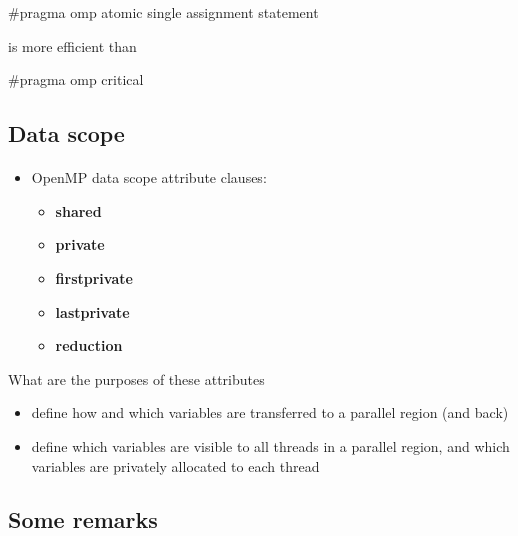 \documentclass[%
oneside,                 %
final,                   %
10pt]{article}
\begin{document}
\bcppcod
#pragma omp atomic { single assignment statement }

\ecppcod

is  more efficient than 


\bcppcod
#pragma omp critical

\ecppcod



\subsection{Data scope}

\paragraph{}
\begin{itemize}
\item OpenMP data scope attribute clauses:
\begin{itemize}

 \item \textbf{shared}

 \item \textbf{private}

 \item \textbf{firstprivate}

 \item \textbf{lastprivate}

 \item \textbf{reduction}
\end{itemize}

\noindent
\end{itemize}

\noindent
What are the purposes of these attributes
\begin{itemize}
\item define how and which variables are transferred to a parallel region (and back)

\item define which variables are visible to all threads in a parallel region, and which variables are privately allocated to each thread
\end{itemize}

\noindent



\subsection{Some remarks}
\end{document}
